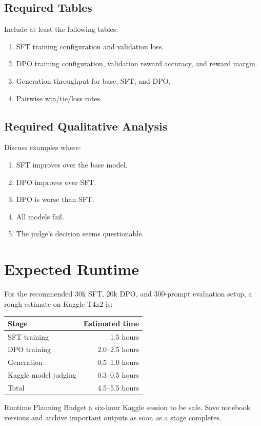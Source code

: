 \documentclass[11pt]{article}
\begin{document}
\subsection{Required Tables}
Include at least the following tables:
\begin{enumerate}[leftmargin=*]
  \item SFT training configuration and validation loss.
  \item DPO training configuration, validation reward accuracy, and reward margin.
  \item Generation throughput for base, SFT, and DPO.
  \item Pairwise win/tie/loss rates.
\end{enumerate}

\subsection{Required Qualitative Analysis}
Discuss examples where:
\begin{enumerate}[leftmargin=*]
  \item SFT improves over the base model.
  \item DPO improves over SFT.
  \item DPO is worse than SFT.
  \item All models fail.
  \item The judge's decision seems questionable.
\end{enumerate}

\section{Expected Runtime}
For the recommended 30k SFT, 20k DPO, and 300-prompt evaluation setup, a rough estimate on Kaggle T4x2 is:
\begin{center}
\begin{tabular}{lr}
\toprule
Stage & Estimated time \\
\midrule
SFT training & 1.5 hours \\
DPO training & 2.0--2.5 hours \\
Generation & 0.5--1.0 hours \\
Kaggle model judging & 0.3--0.5 hours \\
\midrule
Total & 4.5--5.5 hours \\
\bottomrule
\end{tabular}
\end{center}
\begin{warningbox}{Runtime Planning}
Budget a six-hour Kaggle session to be safe. Save notebook versions and archive important outputs as soon as a stage completes.
\end{warningbox}
\end{document}
